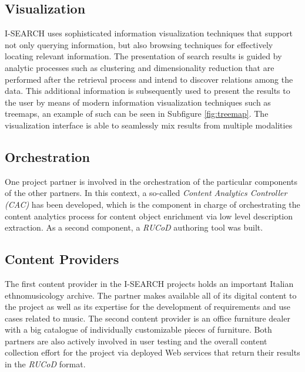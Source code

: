 \documentclass{acm_proc_article-sp}
\let\oldemph\emph
\renewcommand{\emph}[1]{\oldemph{\fontsize{9}{9}\selectfont #1}}
\begin{document}
\subsection{Visualization}
\mbox{I-SEARCH} uses sophisticated information visualization techniques that support not only querying information, but also browsing techniques for effectively locating relevant information.
The presentation of search results is guided by analytic processes such as clustering and dimensionality reduction that are performed after the retrieval process and intend to discover relations among the data.
This additional information is subsequently used to present the results to the user by means of modern information visualization techniques such as treemaps, an example of such can be seen in Subfigure \autoref{fig:treemap}.
The visualization interface is able to seamlessly mix results from multiple modalities
 
\subsection{Orchestration}
One project partner is involved in the orchestration of the particular components of the other partners.
In this context, a so-called \emph{Content Analytics Controller (CAC)} has been developed, which is the component in charge of orchestrating the content analytics process for content object enrichment via low level description extraction.
As a second component, a \emph{RUCoD} authoring tool was built.

\subsection{Content Providers}
The first content provider in the \mbox{I-SEARCH} projects holds an important Italian ethnomusicology archive.
The partner makes available all of its digital content to the project as well as its expertise for the development of requirements and use cases related to music.
The second content provider is an office furniture dealer with a big catalogue of individually customizable pieces of furniture. 
Both partners are also actively involved in user testing and the overall content collection effort for the project via deployed Web services that return their results in the \emph{RUCoD} format.
\end{document}
